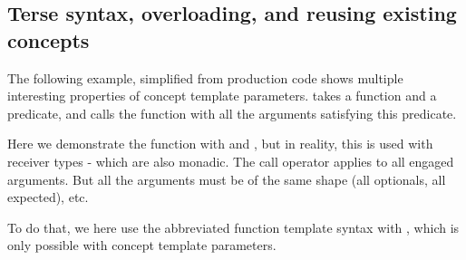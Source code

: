 \documentclass{wg21}
\begin{document}
%
%
%
%
%
%
%
%
%
%

\pagebreak

\subsection{Terse syntax, overloading, and reusing existing concepts}

The following example, simplified from production code shows multiple interesting properties of concept template parameters.
 takes a function and a predicate, and calls the function with all the arguments satisfying this predicate.

Here we demonstrate the function with  and , but in reality, this is used with receiver types - which are also monadic.
The call operator applies  to all engaged arguments. But all the arguments must be of the same shape (all optionals, all expected), etc.

To do that, we here use the abbreviated function template syntax with , which is only possible with concept template parameters.
\end{document}
